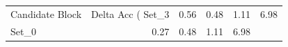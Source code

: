 \begin{tabular}{lrrrr}
\toprule
Candidate Block & Delta Acc (%
\midrule
Set_3 & 0.56 & 0.48 & 1.11 & 6.98 \\
Set_0 & 0.27 & 0.48 & 1.11 & 6.98 \\
\bottomrule
\end{tabular}
